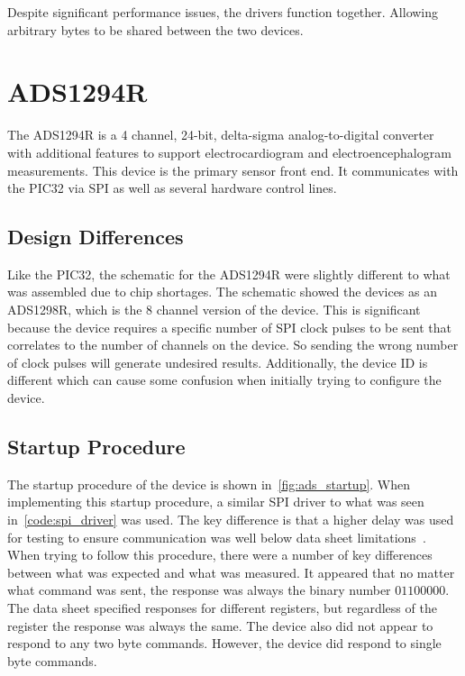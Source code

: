 Despite significant performance issues, the drivers function together.
Allowing arbitrary bytes to be shared between the two devices.


\section{ADS1294R}
The ADS1294R is a 4 channel, 24-bit, delta-sigma analog-to-digital converter with additional features to support electrocardiogram and electroencephalogram measurements.
This device is the primary sensor front end.
It communicates with the PIC32 via SPI as well as several hardware control lines.

\subsection{Design Differences}
Like the PIC32, the schematic for the ADS1294R were slightly different to what was assembled due to chip shortages.
The schematic showed the devices as an ADS1298R, which is the 8 channel version of the device.
This is significant because the device requires a specific number of SPI clock pulses to be sent that correlates to the number of channels on the device.
So sending the wrong number of clock pulses will generate undesired results.
Additionally, the device ID is different which can cause some confusion when initially trying to configure the device.

\subsection{Startup Procedure}
The startup procedure of the device is shown in~\autoref{fig:ads_startup}.
When implementing this startup procedure, a similar SPI driver to what was seen in~\autoref{code:spi_driver} was used.
The key difference is that a higher delay was used for testing to ensure communication was well below data sheet limitations~\cite{ADS}.
When trying to follow this procedure, there were a number of key differences between what was expected and what was measured.
It appeared that no matter what command was sent, the response was always the binary number \(01100000\).
The data sheet specified responses for different registers, but regardless of the register the response was always the same.
The device also did not appear to respond to any two byte commands.
However, the device did respond to single byte commands.

